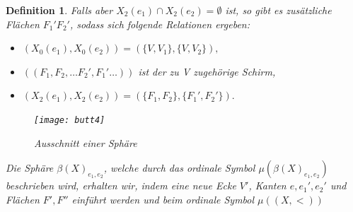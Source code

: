 \documentclass[12pt,titlepage,twoside,cleardoublepage]{article}
\theoremstyle{nummermitklammern}
\newtheorem{definition}[temp]{Definition}
\newtheorem{definition}[zahl]{Definition}
\numberwithin{equation}{section}
\begin{document}
\begin{definition}

Falls aber $X_2(e_1)\cap X_2(e_2)=\emptyset$ ist, so gibt es zusätzliche Flächen $F_1'F_2'$, sodass sich folgende Relationen ergeben: 
\begin{itemize}
\item $(X_0(e_1),X_0(e_2))=(\{V,V_1\},\{V,V_2\}),$
\item $((F_1,F_2,\ldots F_2',F_1'\ldots))$ ist der zu V zugehörige Schirm,
\item $(X_2(e_1),X_2(e_2))=(\{F_1,F_2\},\{F_1',F_2'\}).$
\end{itemize}

\begin{figure}[H]
\begin{center}
\texttt{[image: butt4]}
\end{center}
\caption{Ausschnitt einer Sphäre}
\end{figure}

Die Sphäre $\beta(X)_{e_1,e_2}$, welche durch das ordinale Symbol $\mu(\beta(X)_{e_1,e_2})$ beschrieben wird, erhalten wir, indem eine neue Ecke $V'$, Kanten $e,e_1',e_2'$ und Flächen $F',F''$ einführt werden und beim ordinale Symbol $\mu((X,<))$


\end{definition}
\end{document}
